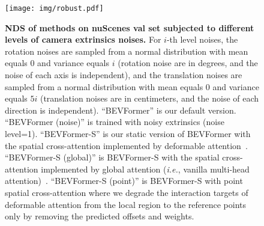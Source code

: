 \documentclass{article}
\def\ie{\emph{i.e.}}
\begin{document}
\begin{figure}[t]
\centering

\texttt{[image: img/robust.pdf]}
\caption{\textbf{NDS of methods on nuScenes val set subjected to different levels of camera extrinsics noises.} For $i$-th level noises, the rotation noises are sampled from a normal distribution with mean equals 0 and variance equals $i$ (rotation noise are in degrees, and the noise of each axis is independent), and the translation noises are sampled from a normal distribution with mean equals 0 and variance equals $5i$ (translation noises are in centimeters,  and the noise of each direction is independent).
``BEVFormer'' is our default version.
``BEVFormer (noise)'' is trained with noisy extrinsics (noise level=1). 
``BEVFormer-S'' is our static version of BEVFormer with the spatial cross-attention implemented by deformable attention~\cite{zhu2020deformable}. ``BEVFormer-S (global)'' is BEVFormer-S with the spatial cross-attention implemented by global attention (\ie, vanilla multi-head attention)~\cite{vaswani2017attention}. ``BEVFormer-S (point)'' is BEVFormer-S with point spatial cross-attention where we degrade the interaction targets of deformable attention from the local region to the reference points only by removing the predicted offsets and weights. }
\label{fig:noise}

\end{figure}



\iffalse
\section{Zero-Shot Transfer}

We train BEVFormer on nuScenes~\cite{caesar2020nuscenes} data but evaluate the model on Waymo Open Dataset on  3D object detection task. This is highly challenging due to the different domains, different perception ranges, and different cameras (including different intrinsics and extrinsic, different number of cameras, different horizontal FOV). 
With nuScenes metrics, BEVFormer achieves 7.6\% NDS on vehicle category, much less than the 42.6\% NDS that obtains by training with Waymo Open Dataset. As shown in Fig.~\ref{fig:waymo_zero_shot},  BEVFormer can detect good results in some scenes. However, overall it generates too many false-positive results and has a very low recall. This challenging task still needs more exploration in future work.
\begin{figure}[h]
\centering
\texttt{[image: img/waymo\_zero\_shot.pdf]}
\caption{Visualization results on Waymo Open Dataset. The yellow and blue bounding boxes are ground truth and our predicted results, respectively, and the confidence score threshold is 0.1.
We only train BEVFormer with nuScenes trainging data. BEVFormer can detect some reasonable bounding boxes.}
\label{fig:waymo_zero_shot}

\end{figure}
\fi
\end{document}
